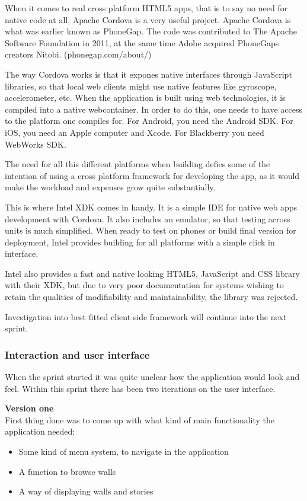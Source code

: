 \documentclass[11pt]{book}
\begin{document}
When it comes to real cross platform HTML5 apps, that is to say no need for native code at all, Apache Cordova is a very useful project. Apache Cordova is what was earlier known as PhoneGap. The code was contributed to The Apache Software Foundation in 2011, at the same time Adobe acquired PhoneGaps creators Nitobi. (phonegap.com/about/)

The way Cordova works is that it expones native interfaces through JavaScript libraries, so that local web clients might use native features like gyroscope, accelerometer, etc. When the application is built using web technologies, it is compiled into a native webcontainer. In order to do this, one needs to have access to the platform one compiles for. For Android, you need the Android SDK. For iOS, you need an Apple computer and Xcode. For Blackberry you need WebWorks SDK.

The need for all this different platforms when building defies some of the intention of using a cross platform framework for developing the app, as it would make the workload and expenses grow quite substantially.

This is where Intel XDK comes in handy. It is a simple IDE for native web apps development with Cordova. It also includes an emulator, so that testing across units is much simplified. When ready to test on phones or build final version for deployment, Intel provides building for all platforms with a simple click in interface.

Intel also provides a fast and native looking HTML5, JavaScript and CSS library with their XDK, but due to very poor documentation for systems wishing to retain the qualities of modifiability and maintainability, the library was rejected.

Investigation into best fitted client side framework will continue into the next sprint.

\subsubsection{Interaction and user interface}
When the sprint started it was quite unclear how the application would look and feel. Within this sprint there has been two iterations on the user interface.

\textbf{Version one}\\
First thing done was to come up with what kind of main functionality the application needed;

\begin{itemize}
\item Some kind of menu system, to navigate in the application
\item A function to browse walls
\item A way of displaying walls and stories
\end{itemize}
\end{document}
